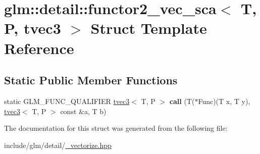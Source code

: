 \hypertarget{structglm_1_1detail_1_1functor2__vec__sca_3_01T_00_01P_00_01tvec3_01_4}{}\section{glm\+:\+:detail\+:\+:functor2\+\_\+vec\+\_\+sca$<$ T, P, tvec3 $>$ Struct Template Reference}
\label{structglm_1_1detail_1_1functor2__vec__sca_3_01T_00_01P_00_01tvec3_01_4}
\subsection*{Static Public Member Functions}
\begin{DoxyCompactItemize}
\item 
\mbox{\label{structglm_1_1detail_1_1functor2__vec__sca_3_01T_00_01P_00_01tvec3_01_4_a9abcc48de3dedce9cbb07d47d520dbc5}} 
static G\+L\+M\+\_\+\+F\+U\+N\+C\+\_\+\+Q\+U\+A\+L\+I\+F\+I\+ER \hyperlink{structglm_1_1tvec3}{tvec3}$<$ T, P $>$ {\bfseries call} (T($\ast$Func)(T x, T y), \hyperlink{structglm_1_1tvec3}{tvec3}$<$ T, P $>$ const \&a, T b)
\end{DoxyCompactItemize}


The documentation for this struct was generated from the following file\+:\begin{DoxyCompactItemize}
\item 
include/glm/detail/\hyperlink{__vectorize_8hpp}{\+\_\+vectorize.\+hpp}\end{DoxyCompactItemize}
